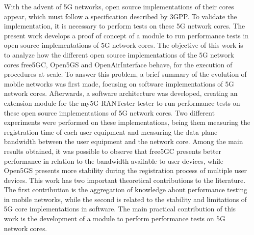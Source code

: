 With the advent of 5G networks, open source implementations of their cores appear, which must follow a specification described by 3GPP.
To validate the implementation, it is necessary to perform tests on these 5G network cores.
The present work develops a proof of concept of a module to run performance tests in open source implementations of 5G network cores.
The objective of this work is to analyze how the different open source implementations of the 5G network cores free5GC, Open5GS and OpenAirInterface behave, for the execution of procedures at scale.
To answer this problem, a brief summary of the evolution of mobile networks was first made, focusing on software implementations of 5G network cores.
Afterwards, a software architecture was developed, creating an extension module for the my5G-RANTester tester to run performance tests on these open source implementations of 5G network cores.
Two different experiments were performed on these implementations, being them measuring the registration time of each user equipment and measuring the data plane bandwidth between the user equipment and the network core.
Among the main results obtained, it was possible to observe that free5GC presents better performance in relation to the bandwidth available to user devices, while Open5GS presents more stability during the registration process of multiple user devices.
This work has two important theoretical contributions to the literature. The first contribution is the aggregation of knowledge about performance testing in mobile networks, while the second is related to the stability and limitations of 5G core implementations in software.
The main practical contribution of this work is the development of a module to perform performance tests on 5G network cores.